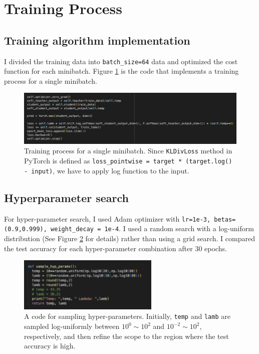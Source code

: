 \documentclass{article}
\begin{document}
\section{Training Process}
\subsection{Training algorithm implementation}
I divided the training data into \texttt{batch\_size=64} data and optimized the cost function for each minibatch. Figure \ref{fig:loss-code} is the code that implements a training process for a single minibatch.

\begin{figure}[h!]
    \centering
    \includegraphics[width=\textwidth]{loss-code.png}
    \caption{Training process for a single minibatch. Since \texttt{KLDivLoss} method in PyTorch is defined as \texttt{loss\_pointwise = target * (target.log() - input)}, we have to apply log function to the input.}
    \label{fig:loss-code}
\end{figure}

\subsection{Hyperparameter search}

For hyper-parameter search, I used Adam optimizer with \texttt{lr=1e-3, betas=(0.9,0.999), weight\_decay = 1e-4}. I used a random search with a log-uniform distribution (See Figure \ref{fig:sample-hyp-code} for details) rather than using a grid search. \cite{bergstra2012random}
I compared the test accuracy for each hyper-parameter combination after 30 epochs.

\begin{figure}[h!]
    \centering
    \includegraphics[width=0.6\textwidth]{sample_hyp-code.png}
    \caption{A code for sampling hyper-parameters. Initially, \texttt{temp} and \texttt{lamb} are sampled log-uniformly between $10^{0}\sim 10^{2}$ and $10^{-2}\sim 10^{2}$, respectively, and then refine the scope to the region where the test accuracy is high. }
    \label{fig:sample-hyp-code}
\end{figure}
\end{document}
